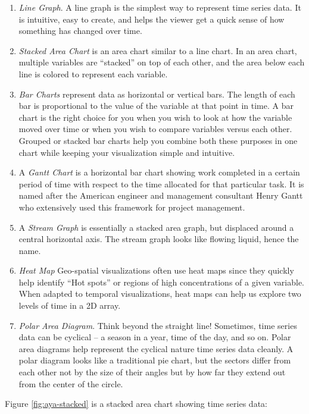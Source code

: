 \documentclass[]{book}
\providecommand{\tightlist}{%
  \setlength{\itemsep}{0pt}\setlength{\parskip}{0pt}}
\theoremstyle{definition}
\theoremstyle{definition}
\theoremstyle{definition}
\theoremstyle{remark}
\begin{document}
\begin{enumerate}
\def\labelenumi{\arabic{enumi}.}
\tightlist
\item
  \emph{Line Graph}. A line graph is the simplest way to represent time
  series data. It is intuitive, easy to create, and helps the viewer get
  a quick sense of how something has changed over time.
\item
  \emph{Stacked Area Chart} is an area chart similar to a line chart. In
  an area chart, multiple variables are ``stacked'' on top of each
  other, and the area below each line is colored to represent each
  variable.
\item
  \emph{Bar Charts} represent data as horizontal or vertical bars. The
  length of each bar is proportional to the value of the variable at
  that point in time. A bar chart is the right choice for you when you
  wish to look at how the variable moved over time or when you wish to
  compare variables versus each other. Grouped or stacked bar charts
  help you combine both these purposes in one chart while keeping your
  visualization simple and intuitive.
\item
  A \emph{Gantt Chart} is a horizontal bar chart showing work completed
  in a certain period of time with respect to the time allocated for
  that particular task. It is named after the American engineer and
  management consultant Henry Gantt who extensively used this framework
  for project management.
\item
  A \emph{Stream Graph} is essentially a stacked area graph, but
  displaced around a central horizontal axis. The stream graph looks
  like flowing liquid, hence the name.
\item
  \emph{Heat Map} Geo-spatial visualizations often use heat maps since
  they quickly help identify ``Hot spots'' or regions of high
  concentrations of a given variable. When adapted to temporal
  visualizations, heat maps can help us explore two levels of time in a
  2D array.
\item
  \emph{Polar Area Diagram}. Think beyond the straight line! Sometimes,
  time series data can be cyclical -- a season in a year, time of the
  day, and so on. Polar area diagrams help represent the cyclical nature
  time series data cleanly. A polar diagram looks like a traditional pie
  chart, but the sectors differ from each other not by the size of their
  angles but by how far they extend out from the center of the circle.
\end{enumerate}

Figure \ref{fig:aya-stacked} is a stacked area chart showing time series
data:
\end{document}
